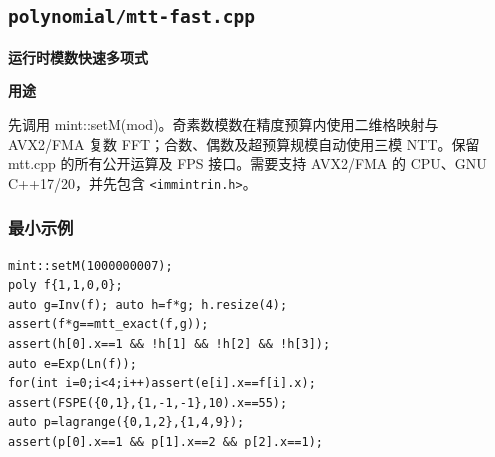 \documentclass[UTF8,a4paper,10pt]{ctexart}
\newcommand{\TemplUsage}[1]{\textbf{用途}\par #1\par}
\begin{document}
\subsection{\texttt{polynomial/mtt-fast.cpp}}
\textbf{运行时模数快速多项式}\par
\TemplUsage{先调用 mint::setM(mod)。奇素数模数在精度预算内使用二维格映射与 AVX2/FMA 复数 FFT；合数、偶数及超预算规模自动使用三模 NTT。保留 mtt.cpp 的所有公开运算及 FPS 接口。需要支持 AVX2/FMA 的 CPU、GNU C++17/20，并先包含 \texttt{<immintrin.h>}。}
\subsubsection*{最小示例}
\begin{lstlisting}
mint::setM(1000000007);
poly f{1,1,0,0};
auto g=Inv(f); auto h=f*g; h.resize(4);
assert(f*g==mtt_exact(f,g));
assert(h[0].x==1 && !h[1] && !h[2] && !h[3]);
auto e=Exp(Ln(f));
for(int i=0;i<4;i++)assert(e[i].x==f[i].x);
assert(FSPE({0,1},{1,-1,-1},10).x==55);
auto p=lagrange({0,1,2},{1,4,9});
assert(p[0].x==1 && p[1].x==2 && p[2].x==1);
\end{lstlisting}
\end{document}

